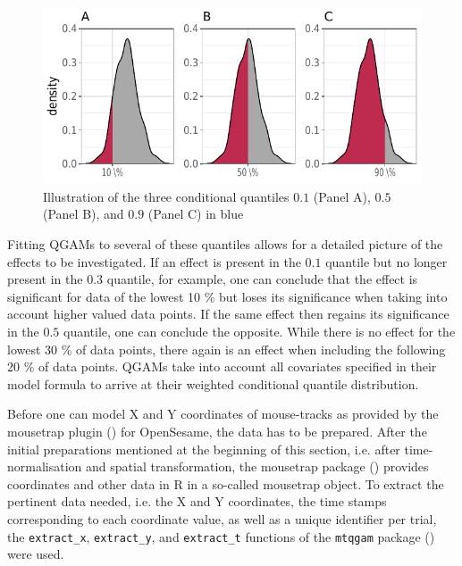 \begin{figure}
    \centering
    \includegraphics[]{figures/fig7.9.pdf}
    \caption{Illustration of the three conditional quantiles $0.1$ (Panel A), $0.5$ (Panel B), and $0.9$ (Panel C) in blue}
    \label{fig:7_9}
\end{figure}

Fitting QGAMs to several of these quantiles allows for a detailed picture of the effects to be investigated. If an effect is present in the $0.1$ quantile but no longer present in the $0.3$ quantile, for example, one can conclude that the effect is significant for data of the lowest 10 \% but loses its significance when taking into account higher valued data points. If the same effect then regains its significance in the $0.5$ quantile, one can conclude the opposite. While there is no effect for the lowest 30 \% of data points, there again is an effect when including the following 20 \% of data points. QGAMs take into account all covariates specified in their model formula to arrive at their weighted conditional quantile distribution. 

Before one can model X and Y coordinates of mouse-tracks as provided by the mousetrap plugin (\cite{Kieslich2017}) for OpenSesame, the data has to be prepared. After the initial preparations mentioned at the beginning of this section, i.e. after time-normalisation and spatial transformation, the mousetrap package (\cite{Kieslich2019}) provides coordinates and other data in R in a so-called mousetrap object. To extract the pertinent data needed, i.e. the X and Y coordinates, the time stamps corresponding to each coordinate value, as well as a unique identifier per trial, the \texttt{extract\_x}, \texttt{extract\_y}, and \texttt{extract\_t} functions of the \texttt{mtqgam} package (\cite{Schmitz2021mtqgam}) were used. 

